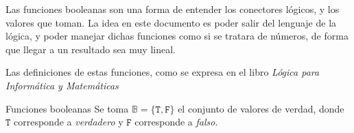  \label{func_bool}

Las funciones booleanas son una forma de entender los conectores lógicos, y los valores que toman. La idea en este documento es poder salir del lenguaje de la lógica, y poder manejar dichas funciones como si se tratara de números, de forma que llegar a un resultado sea muy lineal.

Las definiciones de estas funciones, como se expresa en el libro \emph{Lógica para Informática y Matemáticas} \cite{rocha-2022}

\begin{proofbox}{Funciones booleanas}
    Se toma $\mathbb{B} = \{\texttt{T}, \texttt{F}\}$ el conjunto de valores de verdad, donde $\texttt{T}$ corresponde a \emph{verdadero} y $\texttt{F}$ corresponde a \emph{falso}.


\end{proofbox}

